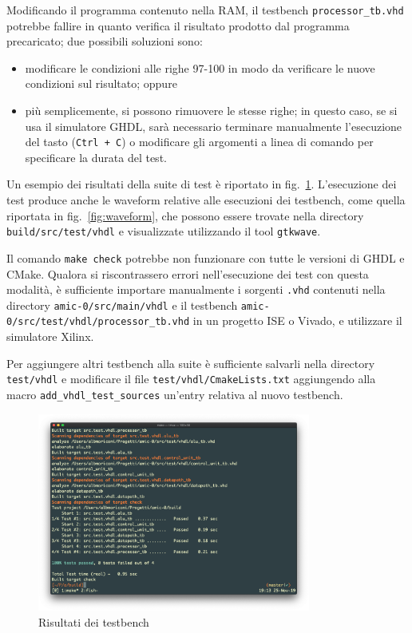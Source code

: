 \documentclass[a4paper,12pt]{scrreprt}
\begin{document}
\begin{warningbox}{}{}
  Modificando il programma contenuto nella RAM, il testbench
  \lstinline{processor_tb.vhd} potrebbe fallire in quanto verifica il risultato
  prodotto dal programma precaricato; due possibili soluzioni sono:
  \begin{itemize}
    \item modificare le condizioni alle righe 97-100 in modo da verificare le
    nuove condizioni sul risultato; oppure
    \item più semplicemente, si possono rimuovere le stesse righe; in questo
    caso, se si usa il simulatore GHDL, sarà necessario terminare manualmente
    l'esecuzione del tasto (\lstinline{Ctrl + C}) o modificare gli argomenti a
    linea di comando per specificare la durata del test.
  \end{itemize}
\end{warningbox}

Un esempio dei risultati della suite di test è riportato in
fig.~\ref{fig:test}. L'esecuzione dei test produce anche le waveform relative
alle esecuzioni dei testbench, come quella riportata in fig.~\ref{fig:waveform},
che possono essere trovate nella directory \lstinline{build/src/test/vhdl} e
visualizzate utilizzando il tool \lstinline{gtkwave}.

\begin{warningbox}{}{}
  Il comando \lstinline{make check} potrebbe non funzionare con tutte le
  versioni di GHDL e CMake. Qualora si riscontrassero errori nell'esecuzione dei
  test con questa modalità, è sufficiente importare manualmente i sorgenti
  \lstinline{.vhd} contenuti nella directory \lstinline{amic-0/src/main/vhdl} e
  il testbench \lstinline{amic-0/src/test/vhdl/processor_tb.vhd} in un progetto
  ISE o Vivado, e utilizzare il simulatore Xilinx.
\end{warningbox}

Per aggiungere altri testbench alla suite è sufficiente salvarli nella
directory \lstinline{test/vhdl} e modificare il file
\lstinline{test/vhdl/CmakeLists.txt} aggiungendo alla macro
\lstinline{add_vhdl_test_sources} un'entry relativa al nuovo testbench.

\begin{figure}
  \centering
  \includegraphics[width=0.8\textwidth]{test.png}
  \caption{Risultati dei testbench}\label{fig:test}
\end{figure}
\end{document}
